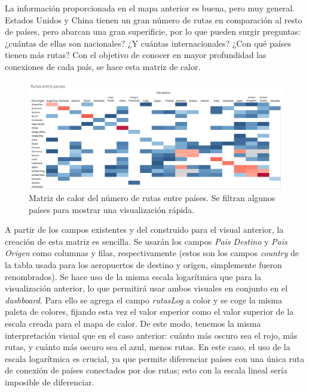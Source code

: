 \documentclass[11pt]{opticajnl}
\begin{document}
La información proporcionada en el mapa anterior es buena, pero muy general. Estados Unidos y China tienen un gran número de rutas en comparación al resto de países, pero abarcan una gran superificie, por lo que pueden surgir preguntas: ¿cuántas de ellas son nacionales? ¿Y cuántas internacionales? ¿Con qué países tienen más rutas? Con el objetivo de conocer en mayor profundidad las conexiones de cada país, se hace esta matriz de calor. \\

\begin{figure}[h]
\centering
\includegraphics[width=\textwidth]{fotos/3.png}
\caption{Matriz de calor del número de rutas entre países. Se filtran algunos países para mostrar una visualización rápida.}
\label{fig:3}
\end{figure}

A partir de los campos existentes y del construido para el visual anterior, la creación de esta matriz es sencilla. Se usarán los campos \textit{Pais Destino} y \textit{Pais Origen} como columnas y filas, respectivamente (estos son los campos \textit{country} de la tabla usada para los aeropuertos de destino y origen, simplemente fueron renombrados). Se hace uso de la misma escala logarítmica que para la visualización anterior, lo que permitirá usar ambos visuales en conjunto en el \textit{dashboard}. Para ello se agrega el campo \textit{rutasLog} a color y se coge la misma paleta de colores, fijando esta vez el valor superior como el valor superior de la escala creada para el mapa de calor. De este modo, tenemos la misma interpretación visual que en el caso anterior: cuánto más oscuro sea el rojo, más rutas, y cuánto más oscuro sea el azul, menos rutas. En este caso, el uso de la escala logarítmica es crucial, ya que permite diferenciar países con una única ruta de conexión de países conectados por dos rutas; esto con la escala lineal sería imposible de diferenciar. \\
\end{document}
